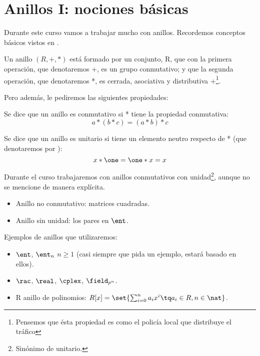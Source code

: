 \chapter{Anillos I: nociones básicas}

Durante este curso vamos a trabajar mucho con anillos. Recordemos conceptos básicos vistos en \cite{apuntesEA}.

\begin{defn}[Anillo]
Un anillo $(R, +, * )$ está formado por un conjunto, R, que con la primera operación, que denotaremos +, es un grupo conmutativo; y que la segunda operación, que denotaremos *, es cerrada, asociativa y distributiva \wrt +\footnote{Pensemos que ésta propiedad es como el policía local que distribuye el tráfico}.
\end{defn}

Pero además, le pediremos las siguientes propiedades:

\begin{defn}
Se dice que un anillo es conmutativo si * tiene la propiedad conmutativa:
\[ a*(b*c) = (a*b)*c \]
\end{defn}

\begin{defn}
Se dice que un anillo es unitario si tiene un elemento neutro respecto de * (que denotaremos por \one):
\[ x*\one = \one*x = x \]
\end{defn}

\obs Durante el curso trabajaremos con anillos conmutativos con unidad\footnote{Sinónimo de unitario.}, aunque no se mencione de manera explícita.

\begin{example}
\begin{itemize}
	\item Anillo no conmutativo: matrices cuadradas.
	\item Anillo sin unidad: los pares en $\ent$.
\end{itemize}
\end{example}

Ejemplos de anillos que utilizaremos:

\begin{example}
\begin{itemize}
	\item $\ent$, $\ent_n$ $n \geq 1$ (casi siempre que pida un ejemplo, estará basado en ellos).
	\item $\rac$, $\real$, $\cplex$, $\field_{p^n}$.
	\item R anillo de polinomios: $R[x] = \set{ \sum_{i=0}^n a_i x^i \tq a_i \in R, n \in \nat}$.
\end{itemize}
\end{example}

